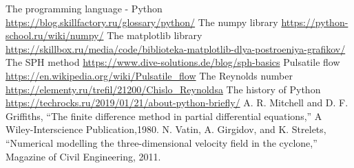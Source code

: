 \begin{thebibliography}{}
 The programming language - Python \url{https://blog.skillfactory.ru/glossary/python/}
 The numpy library \url{https://python-school.ru/wiki/numpy/}
 The matplotlib library \url{https://skillbox.ru/media/code/biblioteka-matplotlib-dlya-postroeniya-grafikov/}
 The SPH method \url{https://www.dive-solutions.de/blog/sph-basics}
 Pulsatile flow \url{https://en.wikipedia.org/wiki/Pulsatile_flow}
 The Reynolds number \url{https://elementy.ru/trefil/21200/Chislo_Reynoldsa}
 The history of Python \url{https://techrocks.ru/2019/01/21/about-python-briefly/}
A. R. Mitchell and D. F. Griffiths, “The finite difference method in partial differential equations,” A Wiley-Interscience Publication,1980.
 N. Vatin, A. Girgidov, and K. Strelets, “Numerical modelling the three-dimensional velocity field in the cyclone,” Magazine of Civil Engineering, 2011.

\end{thebibliography}